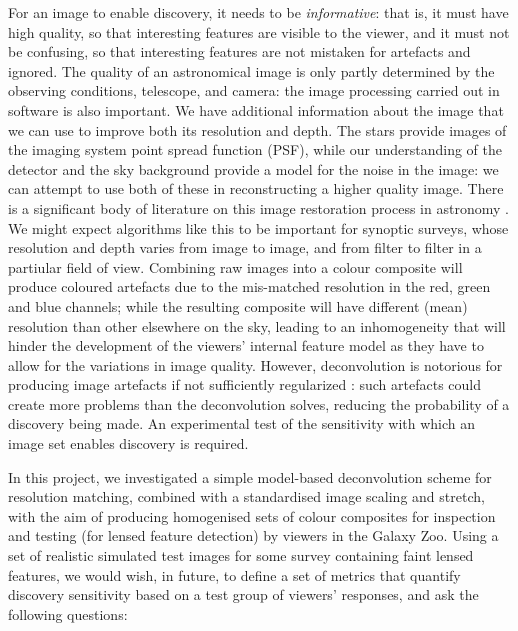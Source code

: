 \documentclass[letterpaper, 11pt]{article}
\begin{document}
For an image to enable discovery, it needs to be {\it informative}: that is,
it must have high quality, so that interesting features are visible to the
viewer, and it must not be confusing, so that interesting features are not
mistaken for artefacts and ignored. The quality of an astronomical image is
only partly determined by the observing conditions, telescope, and camera: the
image processing carried out in software is also important. We have additional
information about the image that we can use to improve both its resolution and
depth. The stars provide images of the imaging system point spread function
(PSF), while our understanding of the detector and the sky background provide
a model for the noise in the image: we can attempt to use both of these in
reconstructing a higher quality image. There is a significant body of
literature on this image restoration process in astronomy \citep[e.g.][]{Ric72, N+N82, S+B84, P+P93, MCS98}. We might
expect algorithms like this to be important for synoptic surveys, whose
resolution and depth varies from image to image, and from filter to filter in
a partiular field of view. Combining raw images into a colour composite will
produce coloured artefacts due to the mis-matched resolution in the red, green
and blue channels; while the resulting composite will have different (mean)
resolution than other elsewhere on the sky, leading to an inhomogeneity that
will hinder the development of the viewers' internal feature model as they
have to allow for the variations in image quality. However, deconvolution is
notorious for producing image artefacts if not sufficiently regularized
\citep[see, for example, comments at the end of section~1 of][]{MCS98}: such artefacts could
create more problems than the deconvolution solves, reducing the probability
of a discovery being made.  An experimental test of the sensitivity with which
an image set enables discovery is required.

In this project, we investigated a simple model-based deconvolution scheme for
resolution matching, combined with a standardised image scaling and stretch, with the aim of
producing homogenised sets of colour composites for inspection and testing
(for lensed feature detection) by viewers in the Galaxy Zoo.
Using a set of realistic simulated test images for some survey 
containing faint lensed features, we would wish, in future, to define a set of metrics that quantify
discovery sensitivity based on a test group of viewers' responses, and 
ask the following questions:
\end{document}
